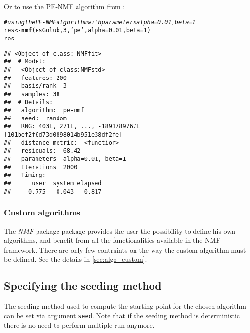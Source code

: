 \documentclass[a4paper]{article}\usepackage[]{graphicx}\usepackage[]{color}
\makeatletter
\newcommand{\hlnum}[1]{\textcolor[rgb]{0.686,0.059,0.569}{#1}}%
\newcommand{\hlstr}[1]{\textcolor[rgb]{0.192,0.494,0.8}{#1}}%
\newcommand{\hlcom}[1]{\textcolor[rgb]{0.678,0.584,0.686}{\textit{#1}}}%
\newcommand{\hlstd}[1]{\textcolor[rgb]{0.345,0.345,0.345}{#1}}%
\newcommand{\hlkwb}[1]{\textcolor[rgb]{0.69,0.353,0.396}{#1}}%
\newcommand{\hlkwc}[1]{\textcolor[rgb]{0.333,0.667,0.333}{#1}}%
\newcommand{\hlkwd}[1]{\textcolor[rgb]{0.737,0.353,0.396}{\textbf{#1}}}%
\newenvironment{kframe}{%
 \def\at@end@of@kframe{}%
 \ifinner\ifhmode%
  \def\at@end@of@kframe{\end{minipage}}%
  \begin{minipage}{\columnwidth}%
 \fi\fi%
 \def\FrameCommand##1{\hskip\@totalleftmargin \hskip-\fboxsep
 \colorbox{shadecolor}{##1}\hskip-\fboxsep
     \hskip-\linewidth \hskip-\@totalleftmargin \hskip\columnwidth}%
 \MakeFramed {\advance\hsize-\width
   \@totalleftmargin\z@ \linewidth\hsize
   \@setminipage}}%
 {\par\unskip\endMakeFramed%
 \at@end@of@kframe}
\newenvironment{knitrout}{}{} %
\let\code=\texttt
\newcommand{\pkgname}[1]{\textit{#1}\xspace}
\newcommand{\Rpkg}[1]{\pkgname{#1} package\xspace}
\newcommand{\nmfpack}{\Rpkg{NMF}}
\renewcommand{\cite}[1]{\parencite{#1}}
\makeatother
\begin{document}
Or to use the PE-NMF algorithm from \cite{Zhang2008}:
\begin{knitrout}
\color{fgcolor}\begin{kframe}
\begin{alltt}
\hlcom{# using the PE-NMF algorithm with parameters alpha=0.01, beta=1}
\hlstd{res} \hlkwb{<-} \hlkwd{nmf}\hlstd{(esGolub,} \hlnum{3}\hlstd{,} \hlstr{'pe'}\hlstd{,} \hlkwc{alpha}\hlstd{=}\hlnum{0.01}\hlstd{,} \hlkwc{beta}\hlstd{=}\hlnum{1}\hlstd{)}
\hlstd{res}
\end{alltt}
\begin{verbatim}
## <Object of class: NMFfit>
##  # Model:
##   <Object of class:NMFstd>
##   features: 200 
##   basis/rank: 3 
##   samples: 38 
##  # Details:
##   algorithm:  pe-nmf 
##   seed:  random 
##   RNG: 403L, 271L, ..., -1891789767L [101bef2f6d73d0898014b951e38df2fe]
##   distance metric:  <function> 
##   residuals:  68.42 
##   parameters: alpha=0.01, beta=1 
##   Iterations: 2000 
##   Timing:
##      user  system elapsed 
##     0.775   0.043   0.817
\end{verbatim}
\end{kframe}
\end{knitrout}

%
%
%


\subsubsection{Custom algorithms}
The \nmfpack package provides the user the possibility to define his own algorithms, and benefit from all the functionalities available in the NMF framework.
There are only few contraints on the way the custom algorithm must be defined.
See the details in \cref{sec:algo_custom}.

\subsection{Specifying the seeding method}\label{sec:seed}
The seeding method used to compute the starting point for the chosen algorithm can be set via argument \code{seed}. 
Note that if the seeding method is deterministic there is no need to perform multiple run anymore.
\end{document}
